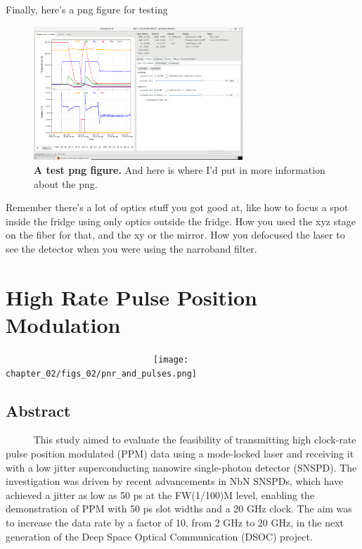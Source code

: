 \documentclass[12pt]{caltech_thesis}
\begin{document}
Finally, here's a png figure for testing

\hypertarget{fig:test_png_figure}{%
\begin{figure}
\centering
\includegraphics[width=0.7\textwidth,height=\textheight]{chapter_01/figs_01/fridge.png}
\caption[{A png figure.}]{\textbf{A test png figure.} And here is where
I'd put in more information about the png.}
\label{fig:test_png_figure}
\end{figure}
}

Remember there's a lot of optics stuff you got good at, like how to
focus a spot inside the fridge using only optics outside the fridge. How
you used the xyz stage on the fiber for that, and the xy or the mirror.
How you defocused the laser to see the detector when you were using the
narroband filter.

\hypertarget{high-rate-pulse-position-modulation}{%
\chapter{High Rate Pulse Position
Modulation}\label{high-rate-pulse-position-modulation}}

~~~~~~~~~~~~~~~~~~~~~~~~~~~~~~\texttt{[image: chapter\_02/figs\_02/pnr\_and\_pulses.png]}

\hypertarget{abstract-1}{%
\section{Abstract}\label{abstract-1}}

~~~~~ This study aimed to evaluate the feasibility of transmitting high
clock-rate pulse position modulated (PPM) data using a mode-locked laser
and receiving it with a low jitter superconducting nanowire
single-photon detector (SNSPD). The investigation was driven by recent
advancements in NbN SNSPDs, which have achieved a jitter as low as 50 ps
at the FW(1/100)M level, enabling the demonstration of PPM with 50 ps
slot widths and a 20 GHz clock. The aim was to increase the data rate by
a factor of 10, from 2 GHz to 20 GHz, in the next generation of the Deep
Space Optical Communication (DSOC) project.
\end{document}
